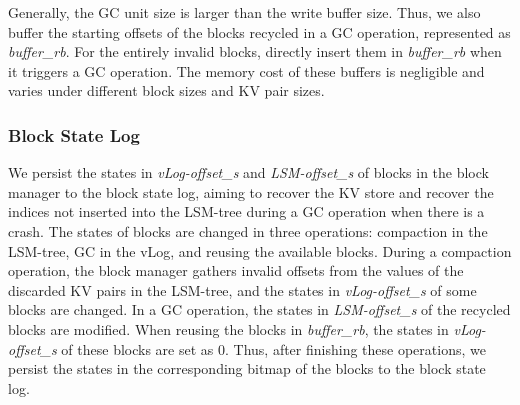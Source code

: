 \documentclass[sigconf]{acmart}
\begin{document}
Generally, the GC unit size is larger than the write buffer size. Thus, we also buffer the starting offsets of the blocks recycled in a GC operation, represented as \textit{buffer\_rb}. For the entirely invalid blocks, directly insert them in \textit{buffer\_rb} when it triggers a GC operation. The memory cost of these buffers is negligible and varies under different block sizes and KV pair sizes. 

\subsubsection{Block State Log}
We persist the states in \textit{vLog-offset\_s} and \textit{LSM-offset\_s} of blocks in the block manager to the block state log, aiming to recover the KV store and recover the indices not inserted into the LSM-tree during a GC operation when there is a crash. The states of blocks are changed in three operations: compaction in the LSM-tree, GC in the vLog, and reusing the available blocks. During a compaction operation, the block manager gathers invalid offsets from the values of the discarded KV pairs in the LSM-tree, and the states in \textit{vLog-offset\_s} of some blocks are changed. In a GC operation, the states in \textit{LSM-offset\_s} of the recycled blocks are modified. When reusing the blocks in \textit{buffer\_rb}, the states in \textit{vLog-offset\_s} of these blocks are set as 0. Thus, after finishing these operations, we persist the states in the corresponding bitmap of the blocks to the block state log.  

\end{document}
